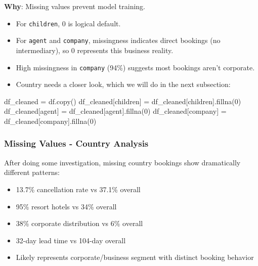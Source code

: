 \documentclass[
  letterpaper,
  DIV=11,
  numbers=noendperiod]{scrartcl}
\newenvironment{Shaded}{\begin{snugshade}}{\end{snugshade}}
\newcommand{\DecValTok}[1]{\textcolor[rgb]{0.68,0.00,0.00}{#1}}
\newcommand{\NormalTok}[1]{\textcolor[rgb]{0.00,0.23,0.31}{#1}}
\newcommand{\OperatorTok}[1]{\textcolor[rgb]{0.37,0.37,0.37}{#1}}
\newcommand{\StringTok}[1]{\textcolor[rgb]{0.13,0.47,0.30}{#1}}
\providecommand{\tightlist}{%
  \setlength{\itemsep}{0pt}\setlength{\parskip}{0pt}}
\renewenvironment{Shaded}{%
  \begin{tcolorbox}[%
    enhanced,%
    colback=codebg,%
    colframe=codebg,%
    borderline west={3pt}{0pt}{sectionblue},%
    fontupper=\small\ttfamily,%
    boxrule=0pt,%
    arc=0pt,%
    boxsep=5pt,%
    left=2mm,%
    right=2mm,%
    top=2mm,%
    bottom=2mm%
  ]%
}{%
  \end{tcolorbox}%
}
\begin{document}
\textbf{Why}: Missing values prevent model training.

\begin{itemize}
\tightlist
\item
  For \texttt{children}, 0 is logical default.
\item
  For \texttt{agent} and \texttt{company}, missingness indicates direct
  bookings (no intermediary), so 0 represents this business reality.
\item
  High missingness in \texttt{company} (94\%) suggests most bookings
  aren't corporate.
\item
  Country needs a closer look, which we will do in the next subsection:
\end{itemize}

\begin{Shaded}
\begin{Highlighting}[]
\NormalTok{df\_cleaned }\OperatorTok{=}\NormalTok{ df.copy()}
\NormalTok{df\_cleaned[}\StringTok{\textquotesingle{}children\textquotesingle{}}\NormalTok{] }\OperatorTok{=}\NormalTok{ df\_cleaned[}\StringTok{\textquotesingle{}children\textquotesingle{}}\NormalTok{].fillna(}\DecValTok{0}\NormalTok{)}
\NormalTok{df\_cleaned[}\StringTok{\textquotesingle{}agent\textquotesingle{}}\NormalTok{] }\OperatorTok{=}\NormalTok{ df\_cleaned[}\StringTok{\textquotesingle{}agent\textquotesingle{}}\NormalTok{].fillna(}\DecValTok{0}\NormalTok{)}
\NormalTok{df\_cleaned[}\StringTok{\textquotesingle{}company\textquotesingle{}}\NormalTok{] }\OperatorTok{=}\NormalTok{ df\_cleaned[}\StringTok{\textquotesingle{}company\textquotesingle{}}\NormalTok{].fillna(}\DecValTok{0}\NormalTok{)}
\end{Highlighting}
\end{Shaded}

\subsubsection{Missing Values - Country
Analysis}\label{missing-values---country-analysis}

After doing some investigation, missing country bookings show
dramatically different patterns:

\begin{itemize}
\tightlist
\item
  13.7\% cancellation rate vs 37.1\% overall
\item
  95\% resort hotels vs 34\% overall\\
\item
  38\% corporate distribution vs 6\% overall
\item
  32-day lead time vs 104-day overall
\item
  Likely represents corporate/business segment with distinct booking
  behavior
\end{itemize}
\end{document}
